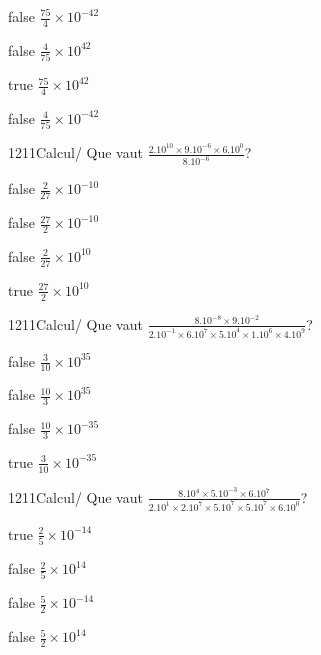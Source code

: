             \begin{reponses}
                \item[false] $\frac{75}{4}\times 10^{-42}$
                \item[false] $\frac{4}{75}\times 10^{42}$
                \item[true] $\frac{75}{4}\times 10^{42}$
                \item[false] $\frac{4}{75}\times 10^{-42}$
            \end{reponses}
            \begin{question}{1211}{Calcul}{}{/}
                Que vaut $\frac{2.10^{10}\times 9.10^{-6}\times 6.10^{0}}{8.10^{-6}}$?
            \end{question}
            \begin{reponses}
                \item[false] $\frac{2}{27}\times 10^{-10}$
                \item[false] $\frac{27}{2}\times 10^{-10}$
                \item[false] $\frac{2}{27}\times 10^{10}$
                \item[true] $\frac{27}{2}\times 10^{10}$
            \end{reponses}
            \begin{question}{1211}{Calcul}{}{/}
                Que vaut $\frac{8.10^{-8}\times 9.10^{-2}}{2.10^{-1}\times 6.10^{7}\times 5.10^{4}\times 1.10^{6}\times 4.10^{9}}$?
            \end{question}
            \begin{reponses}
                \item[false] $\frac{3}{10}\times 10^{35}$
                \item[false] $\frac{10}{3}\times 10^{35}$
                \item[false] $\frac{10}{3}\times 10^{-35}$
                \item[true] $\frac{3}{10}\times 10^{-35}$
            \end{reponses}
            \begin{question}{1211}{Calcul}{}{/}
                Que vaut $\frac{8.10^{4}\times 5.10^{-3}\times 6.10^{7}}{2.10^{1}\times 2.10^{7}\times 5.10^{7}\times 5.10^{7}\times 6.10^{0}}$?
            \end{question}
            \begin{reponses}
                \item[true] $\frac{2}{5}\times 10^{-14}$
                \item[false] $\frac{2}{5}\times 10^{14}$
                \item[false] $\frac{5}{2}\times 10^{-14}$
                \item[false] $\frac{5}{2}\times 10^{14}$
            \end{reponses}
